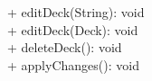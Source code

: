 { 
    + editDeck(String): void \\ 
    + editDeck(Deck): void \\ 
    + deleteDeck(): void\\
    + applyChanges(): void \\
}{}